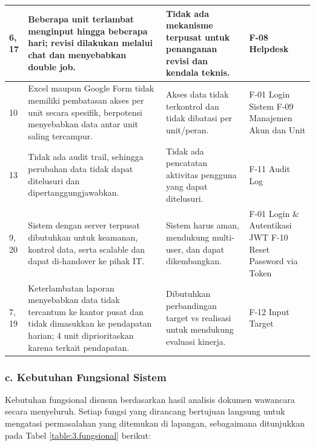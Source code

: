 \begin{longtable}{|p{}|p{}|p{}|p{}|}
    \hline
    6, 17 & Beberapa unit terlambat menginput hingga beberapa hari; revisi dilakukan melalui chat dan menyebabkan double job. & Tidak ada mekanisme terpusat untuk penanganan revisi dan kendala teknis. & F-08 Helpdesk \\
    \hline
    10 & Excel maupun Google Form tidak memiliki pembatasan akses per unit secara spesifik, berpotensi menyebabkan data antar unit saling tercampur. & Akses data tidak terkontrol dan tidak dibatasi per unit/peran. & F-01 Login Sistem \newline F-09 Manajemen Akun dan Unit \\
    \hline
    13 & Tidak ada audit trail, sehingga perubahan data tidak dapat ditelusuri dan dipertanggungjawabkan. & Tidak ada pencatatan aktivitas pengguna yang dapat ditelusuri. & F-11 Audit Log \\
    \hline
    9, 20 & Sistem dengan server terpusat dibutuhkan untuk keamanan, kontrol data, serta scalable dan dapat di-handover ke pihak IT. & Sistem harus aman, mendukung multi-user, dan dapat dikembangkan. & F-01 Login \& Autentikasi JWT \newline F-10 Reset Password via Token \\
    \hline
    7, 19 & Keterlambatan laporan menyebabkan data tidak tercantum ke kantor pusat dan tidak dimasukkan ke pendapatan harian; 4 unit diprioritaskan karena terkait pendapatan. & Dibutuhkan perbandingan target vs realisasi untuk mendukung evaluasi kinerja. & F-12 Input Target \\
    \hline
\end{longtable}

\subsubsection*{c. Kebutuhan Fungsional Sistem}
Kebutuhan fungsional disusun berdasarkan hasil analisis dokumen wawancara secara menyeluruh. Setiap fungsi yang dirancang bertujuan langsung untuk mengatasi permasalahan yang ditemukan di lapangan, sebagaimana ditunjukkan pada Tabel \ref{table:3.fungsional} berikut:

